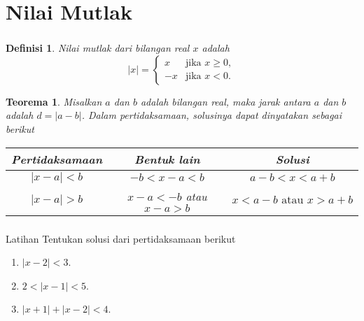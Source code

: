 \documentclass[aspectratio=169]{beamer}
\newtheorem{definisi}{Definisi}
\newtheorem{teorema}{Teorema}
\theoremstyle{definition}
\begin{document}
    \section{Nilai Mutlak}
    \begin{frame}
        \frametitle{\insertsection}
        \begin{definisi}
            Nilai mutlak dari bilangan real $x$ adalah
            \[|x|=\begin{cases}
                x & \text{jika } x\geq 0,\\
                -x & \text{jika } x<0.
            \end{cases}\]
        \end{definisi}
        \begin{teorema}
            Misalkan $a$ dan $b$ adalah bilangan real, maka jarak antara $a$ dan $b$ adalah $d=|a-b|$. Dalam pertidaksamaan, solusinya dapat dinyatakan sebagai berikut\\
            \begin{center}
            \begin{tabular}{c|c|c}
                \hline
                Pertidaksamaan &Bentuk lain& Solusi\\
                \hline
                $|x-a|<b$ &$-b<x-a<b$& $a-b<x<a+b$\\
                $|x-a|>b$ &$x-a<-b$ atau $x-a>b$& $x<a-b \text{ atau } x>a+b$\\
            \end{tabular}
        \end{center}
        \end{teorema}
    \end{frame}

    \begin{frame}
        \frametitle{\insertsection}
        \begin{exampleblock}{Latihan}
            Tentukan solusi dari pertidaksamaan berikut
            \begin{enumerate}[label=(\alph*)]
                \item $|x-2|<3$.
                \item $2<|x-1|<5$.
                \item $|x+1|+|x-2|<4$.
            \end{enumerate}
        \end{exampleblock}
    \end{frame}
\end{document}

